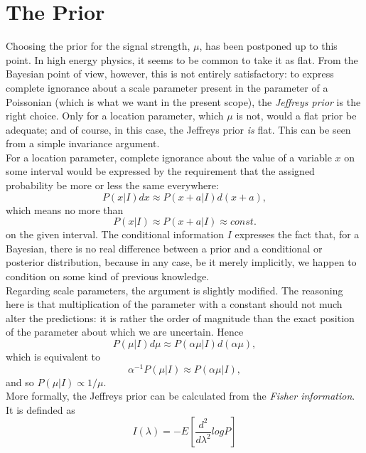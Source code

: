 \documentclass[aps,prb,twocolumn,showpacs,superscriptaddress,groupedaddress]{revtex4}  %
\begin{document}
\section{The Prior}
Choosing the prior for the signal strength, $\mu$, has been postponed up to this point. In high energy physics, it seems to be common to take it as flat. From the Bayesian point of view, however, this is not entirely satisfactory: to express complete ignorance about a scale parameter present in the parameter of a Poissonian (which is what we want in the present scope), the \emph{Jeffreys prior}\cite{jeffreys} is the right choice. Only for a location parameter, which $\mu$ is not, would a flat prior be adequate; and of course, in this case, the Jeffreys prior \emph{is} flat. This can be seen from a simple invariance argument.\cite{sivia,bretthorst}\\ 
For a location parameter, complete ignorance about the value of a variable $x$ on some interval would be expressed by the requirement that the assigned probability be more or less the same everywhere:
\begin{equation}
P(x|I)dx \approx P(x+a|I)d(x+a),
\end{equation}
which means no more than
\begin{equation}
P(x|I) \approx P(x+a|I) \approx const.
\end{equation}
on the given interval. The conditional information $I$ expresses the fact that, for a Bayesian, there is no real difference between a prior and a conditional or posterior distribution, because in any case, be it merely implicitly, we happen to condition on some kind of previous knowledge.\\
Regarding scale parameters, the argument is slightly modified. The reasoning here is that multiplication of the parameter with a constant should not much alter the predictions: it is rather the order of magnitude than the exact position of the parameter about which we are uncertain. Hence
\begin{equation}
P(\mu|I)d\mu \approx P(\alpha\mu|I)d(\alpha\mu),
\end{equation}
which is equivalent to
\begin{equation}
\alpha^{-1}P(\mu|I) \approx P(\alpha\mu|I),
\end{equation}
and so $P(\mu|I) \propto 1/\mu$.\\
More formally, the Jeffreys prior can be calculated from the \emph{Fisher information}\cite{kuensch}. It is definded as
\begin{equation}
I(\lambda)=-E[\frac{d^{2}}{d\lambda^{2}}log P]
\end{equation}
\end{document}
